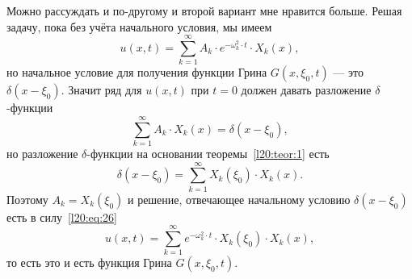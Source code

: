 Можно рассуждать и по-другому и второй вариант мне нравится больше. Решая задачу, пока без учёта начального условия, мы имеем
\begin{equation}\label{l20:eq:26}
	u(x,t)=\sum\limits_{k=1}^{\infty}A_k\cdot e^{-\omega_k^2\cdot t}\cdot X_k(x),
\end{equation}
но начальное условие для получения функции Грина $G(x,\xi_0,t)$ --- это $\delta(x-\xi_0)$. Значит ряд для $u(x,t)$ при $t=0$ должен давать разложение $\delta$-функции
\begin{equation*}
	\sum\limits_{k=1}^{\infty}A_k\cdot X_k(x)=\delta(x-\xi_0),
\end{equation*}
но разложение $\delta$-функции на основании теоремы~\ref{l20:teor:1} есть
\begin{equation*}
	\delta(x-\xi_0)=\sum\limits_{k=1}^{\infty}X_k(\xi_0)\cdot X_k(x).
\end{equation*}
Поэтому $A_k=X_k(\xi_0)$ и решение, отвечающее начальному условию $\delta(x-\xi_0)$ есть в силу~\eqref{l20:eq:26}
\begin{equation*}
	u(x,t)=\sum\limits_{k=1}^{\infty}e^{-\omega_k^2\cdot t}\cdot X_k(\xi_0)\cdot X_k(x),
\end{equation*}
то есть это и есть функция Грина $G(x,\xi_0,t)$.
